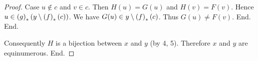\documentclass[../../set-theory/set-theory.tex]{subfiles}
\begin{document}
\begin{forthel}
\begin{proof}
          Case $u \notin c$ and $v \in c$.
            Then $H(u) = G(u)$ and $H(v) = F(v)$.
            Hence $u \in \left(g\right)_{*}(y \setminus \left(f\right)_{*}(c))$.
            We have $G(u) \in y \setminus \left(f\right)_{*}(c)$.
            Thus $G(u) \neq F(v)$.
          End.
        End.

        Consequently $H$ is a bijection between $x$ and $y$ (by 4, 5).
        Therefore $x$ and $y$ are equinumerous.
      End.
    \end{proof}
  \end{forthel}
\end{document}
